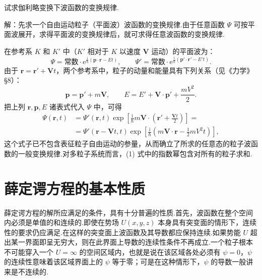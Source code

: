 \begin{xiti}

\quad 试求伽利略变换下波函数的变换规律.

解：先求一个自由运动粒子（平面波）波函数的变换规律.由于任意函数 $\varPsi$ 可按平面波展开，求得平面波的变换规律后，就可求得任意波函数的变换规律.

在参考系 $K$ 和 $K'$ 中（$K'$ 相对于 $K$ 以速度 $\boldsymbol{V}$ 运动）的平面波为：
\begin{equation*}
  \varPsi=\text{常数}\cdot
  \mathrm{e}^{\frac{\mathrm{i}}{\hbar}(\boldsymbol{p}\cdot\boldsymbol{r}-Et)},
  \qquad
  \varPsi'=\text{常数}\cdot
  \mathrm{e}^{\frac{\mathrm{i}}{\hbar}(\boldsymbol{p}'\cdot\boldsymbol{r}'-E't)}.
\end{equation*}
由于 $\boldsymbol{r}=\boldsymbol{r}'+\boldsymbol{V}t$，两个参考系中，粒子的动量和能量具有下列关系（见《力学》§8）：
\begin{equation*}
  \boldsymbol{p}=\boldsymbol{p}'+m\boldsymbol{V},\qquad
  E=E'+\boldsymbol{V}\cdot\boldsymbol{p}'+\frac{mV^2}{2}.
\end{equation*}
把上列 $\boldsymbol{r},\boldsymbol{p},E$ 诸表式代入 $\varPsi$ 中，可得
\begin{equation*}
\begin{aligned}
  \varPsi(\boldsymbol{r},t)
  &=\varPsi'(\boldsymbol{r},t)\exp\left[
  \frac{\mathrm{i}}{\hbar}m\boldsymbol{V}\cdot
  \left(\boldsymbol{r}'+\frac{\boldsymbol{V}t}{2}\right)\right]=\\
  &=\varPsi'(\boldsymbol{r}-\boldsymbol{V}t,t)\exp\left[
  \frac{\mathrm{i}}{\hbar}\left(m\boldsymbol{V}\cdot\boldsymbol{r}
  -\frac{1}{2}mV^2t\right)\right],
\end{aligned}
\end{equation*}
这个式子已不包含表征粒子自由运动的参量，从而确立了所求的任意态的粒子波函数的一般变换规律.对多粒子系统而言，(1) 式中的指数幂包含对所有的粒子求和.

\end{xiti}

\section{薛定谔方程的基本性质}

薛定谔方程的解所应满足的条件，具有十分普遍的性质.首先，波函数在整个空间内必须是单值的和连续的.即使在势场 $U(x,y,z)$ 本身具有突变面的情形下，连续性的要求仍应满足.在这样的突变面上波函数及其导数都应保持连续.如果势能 $U$ 超出某一界面即呈无穷大，则在此界面上导数的连续性条件不再成立.一个粒子根本不可能穿入一个 $U=\infty$ 的空间区域内，也就是说在该区域各处必须有 $\psi=0$，$\psi$ 的连续性意味着该区域界面上的 $\psi$ 等于零；可是在这种情形下，$\psi$ 的导数一般讲来是不连续的.

